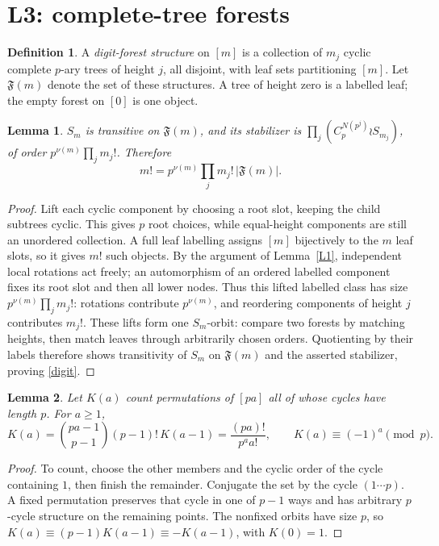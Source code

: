 \documentclass[10pt]{article}
\newtheorem{lemma}{Lemma}
\theoremstyle{definition}\newtheorem*{definition}{Definition}
\theoremstyle{remark}\newtheorem*{remark}{Remark}
\newcommand{\F}{\mathfrak F}
\begin{document}
\section{L3: complete-tree forests}
\begin{definition} A \emph{digit-forest structure} on $[m]$ is a collection of
$m_j$ cyclic complete $p$-ary trees of height $j$, all disjoint, with leaf sets
partitioning $[m]$. Let $\F(m)$ denote the set of these structures. A tree of
height zero is a labelled leaf; the empty forest on $[0]$ is one object.\end{definition}

\begin{lemma}\label{stabilizer} $S_m$ is transitive on $\F(m)$, and its
stabilizer is $\prod_j(C_p^{N(p^j)}\wr S_{m_j})$, of order
$p^{\nu(m)}\prod_jm_j!$. Therefore
\begin{equation}\label{digit}
 m!=p^{\nu(m)}\prod_jm_j!\,|\F(m)|.
\end{equation}\end{lemma}
\begin{proof} Lift each cyclic component by choosing a root slot, keeping
the child subtrees cyclic. This gives $p$ root choices, while equal-height
components are still an unordered collection. A full leaf labelling assigns
$[m]$ bijectively to the $m$ leaf slots, so it gives $m!$ such objects. By the
argument of Lemma~\ref{L1}, independent local rotations act freely; an
automorphism of an ordered labelled component fixes its root slot and then
all lower nodes. Thus this lifted labelled class has size
$p^{\nu(m)}\prod_jm_j!$: rotations contribute $p^{\nu(m)}$, and reordering
components of height $j$ contributes $m_j!$. These lifts form one $S_m$-orbit:
compare two forests by matching heights, then match leaves through arbitrarily
chosen orders. Quotienting by their labels therefore shows transitivity of
$S_m$ on $\F(m)$ and the asserted stabilizer, proving \eqref{digit}.\end{proof}

\begin{lemma}\label{K} Let $K(a)$ count permutations of $[pa]$ all of whose
cycles have length $p$. For $a\ge1$,
\begin{equation}\label{Kexact}
 K(a)=\binom{pa-1}{p-1}(p-1)!\,K(a-1)=\frac{(pa)!}{p^aa!},\qquad
 K(a)\equiv(-1)^a\pmod p.
\end{equation}\end{lemma}
\begin{proof} To count, choose the other members and the cyclic order of the
cycle containing $1$, then finish the remainder. Conjugate the set by the cycle
$(1\cdots p)$. A fixed permutation preserves that cycle in one of $p-1$ ways
and has arbitrary $p$-cycle structure on the remaining points. The nonfixed
orbits have size $p$, so $K(a)\equiv(p-1)K(a-1)\equiv-K(a-1)$, with $K(0)=1$.\end{proof}
\end{document}
